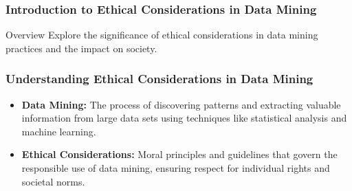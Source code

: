 \documentclass[aspectratio=169]{beamer}
\begin{document}
\frame{\titlepage}

\begin{frame}[fragile]
    \frametitle{Introduction to Ethical Considerations in Data Mining}
    \begin{block}{Overview}
        Explore the significance of ethical considerations in data mining practices and the impact on society.
    \end{block}
\end{frame}

\begin{frame}[fragile]
    \frametitle{Understanding Ethical Considerations in Data Mining}
    \begin{itemize}
        \item \textbf{Data Mining:} The process of discovering patterns and extracting valuable information from large data sets using techniques like statistical analysis and machine learning.
        \item \textbf{Ethical Considerations:} Moral principles and guidelines that govern the responsible use of data mining, ensuring respect for individual rights and societal norms.
    \end{itemize}
\end{frame}
\end{document}
